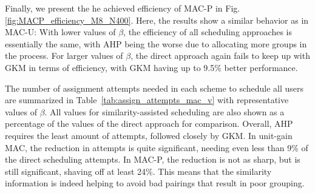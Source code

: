 Finally, we present the he achieved efficiency of MAC-P in Fig.\ref{fig:MACP_efficiency_M8_N400}. Here, the results show a similar behavior as in MAC-U: With lower values of $\beta$, the efficiency of all scheduling approaches is essentially the same, with AHP being the worse due to allocating more groups in the process. For larger values of $\beta$, the direct approach again fails to keep up with GKM in terms of efficiency, with GKM having up to 9.5\% better performance. 


The number of assignment attempts needed in each scheme to schedule all users are summarized in Table~\ref{tab:assign_attempts_mac_v} with representative values of $\beta$.
All values for similarity-assisted scheduling are also shown as a percentage of the values of the direct approach for comparison.
Overall, AHP requires the least amount of attempts, followed closely by GKM. In unit-gain MAC, the reduction in attempts is quite significant, needing even less than 9\% of the direct scheduling attempts. In MAC-P, the reduction is not as sharp, but is still significant, shaving off at least 24\%. This means that the similarity information is indeed helping to avoid bad pairings that result in poor grouping.


